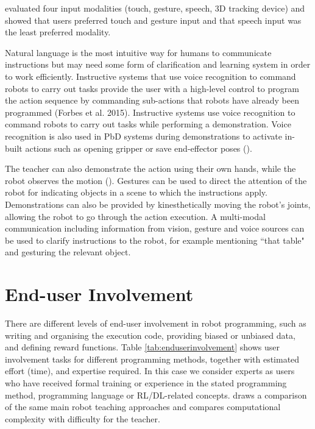 \cite{profanter2015analysis} evaluated four input modalities (touch, gesture, speech, 3D tracking device) and showed that users preferred touch and gesture input and that speech input was the least preferred modality.

Natural language is the most intuitive way for humans to communicate instructions but may need some form of clarification and learning system in order to work efficiently. 
Instructive systems that use voice recognition to command robots to carry out tasks provide the user with a high-level control to program the action sequence by commanding sub-actions that robots have already been programmed (Forbes et al. 2015).
Instructive systems use voice recognition to command robots to carry out tasks while performing a demonstration.
Voice recognition is also used in PbD systems during demonstrations to activate in-built actions such as opening gripper or save end-effector poses (\cite{alexandrova2014robot}).

The teacher can also demonstrate the action using their own hands, while the robot observes the motion (\cite{kuniyoshi1994learning}).
Gestures can be used to direct the attention of the robot for indicating objects in a scene to which the instructions apply.
Demonstrations can also be provided by kinesthetically moving the robot's joints, allowing the robot to go through the action execution.
A multi-modal communication including information from vision, gesture and voice sources can be used to clarify instructions to the robot, for example mentioning ``that table" and gesturing the relevant object.


\section{End-user Involvement}\label{sssec:End-User Involvement}
There are different levels of end-user involvement in robot programming, such as writing and organising the execution code, providing biased or unbiased data, and defining reward functions. 
Table \ref{tab:enduserinvolvement} shows user involvement tasks for different programming methods, together with estimated effort (\eg time), and expertise required.
In this case we consider experts as users who have received formal training or experience in the stated programming method, \eg programming language or RL/DL-related concepts.
\cite{kormushev2013reinforcement} draws a comparison of the same main robot teaching approaches and compares computational complexity with difficulty for the teacher.

